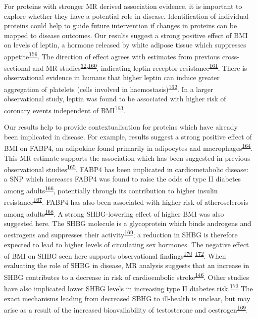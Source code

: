 \documentclass[11pt,twoside]{bristolthesis}
\begin{document}
For proteins with stronger MR derived association evidence, it is important to explore whether they have a potential role in disease. Identification of individual proteins could help to guide future intervention if changes in proteins can be mapped to disease outcomes. Our results suggest a strong positive effect of BMI on levels of leptin, a hormone released by white adipose tissue which suppresses appetite\textsuperscript{\protect\hyperlink{ref-Klok2007}{159}}. The direction of effect agrees with estimates from previous cross-sectional and MR studies\textsuperscript{\protect\hyperlink{ref-Wurtz2014}{32},\protect\hyperlink{ref-Millard2015}{160}}, indicating leptin receptor resistance\textsuperscript{\protect\hyperlink{ref-Gruzdeva2019a}{161}}. There is observational evidence in humans that higher leptin can induce greater aggregation of platelets (cells involved in haemostasis)\textsuperscript{\protect\hyperlink{ref-Nakata1999}{162}}. In a larger observational study, leptin was found to be associated with higher risk of coronary events independent of BMI\textsuperscript{\protect\hyperlink{ref-Wallace2001}{163}}.

Our results help to provide contextualisation for proteins which have already been implicated in disease. For example, results suggest a strong positive effect of BMI on FABP4, an adipokine found primarily in adipocytes and macrophages\textsuperscript{\protect\hyperlink{ref-Furuhashi2014}{164}}. This MR estimate supports the association which has been suggested in previous observational studies\textsuperscript{\protect\hyperlink{ref-Xu2006}{165}}. FABP4 has been implicated in cardiometabolic disease: a SNP which increases FABP4 was found to raise the odds of type II diabetes among adults\textsuperscript{\protect\hyperlink{ref-Gudmundsdottir2020}{166}}, potentially through its contribution to higher insulin resistance\textsuperscript{\protect\hyperlink{ref-Nakamura2017}{167}}. FABP4 has also been associated with higher risk of atherosclerosis among adults\textsuperscript{\protect\hyperlink{ref-Yeung2007}{168}}. A strong SHBG-lowering effect of higher BMI was also suggested here. The SHBG molecule is a glycoprotein which binds androgens and oestrogens and suppresses their activity\textsuperscript{\protect\hyperlink{ref-Wallace2013}{169}}; a reduction in SHBG is therefore expected to lead to higher levels of circulating sex hormones. The negative effect of BMI on SHBG seen here supports observational findings\textsuperscript{\protect\hyperlink{ref-Cooper2015}{170}--\protect\hyperlink{ref-Baglietto2009}{172}}. When evaluating the role of SHBG in disease, MR analysis suggests that an increase in SHBG contributes to a decrease in risk of cardioembolic stroke\textsuperscript{\protect\hyperlink{ref-Zheng2020}{146}}. Other studies have also implicated lower SHBG levels in increasing type II diabetes risk.\textsuperscript{\protect\hyperlink{ref-Ritchie2019}{173}} The exact mechanisms leading from decreased SBHG to ill-health is unclear, but may arise as a result of the increased bioavailability of testosterone and oestrogen\textsuperscript{\protect\hyperlink{ref-Wallace2013}{169}}.
\end{document}
